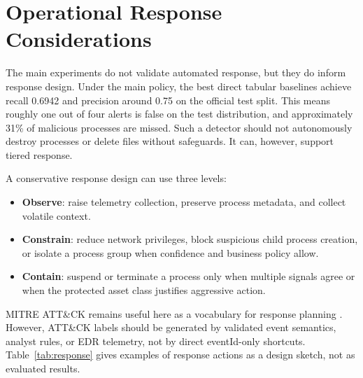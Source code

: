 \documentclass[journal]{IEEEtran}
\begin{document}
\section{Operational Response Considerations}
\label{sec:response}

The main experiments do not validate automated response, but they do inform response design. Under the main policy, the best direct tabular baselines achieve recall 0.6942 and precision around 0.75 on the official test split. This means roughly one out of four alerts is false on the test distribution, and approximately 31\% of malicious processes are missed. Such a detector should not autonomously destroy processes or delete files without safeguards. It can, however, support tiered response.

A conservative response design can use three levels:
\begin{itemize}
    \item \textbf{Observe}: raise telemetry collection, preserve process metadata, and collect volatile context.
    \item \textbf{Constrain}: reduce network privileges, block suspicious child process creation, or isolate a process group when confidence and business policy allow.
    \item \textbf{Contain}: suspend or terminate a process only when multiple signals agree or when the protected asset class justifies aggressive action.
\end{itemize}

MITRE ATT\&CK remains useful here as a vocabulary for response planning \cite{mitre2023}. However, ATT\&CK labels should be generated by validated event semantics, analyst rules, or EDR telemetry, not by direct eventId-only shortcuts. Table~\ref{tab:response} gives examples of response actions as a design sketch, not as evaluated results.
\end{document}

